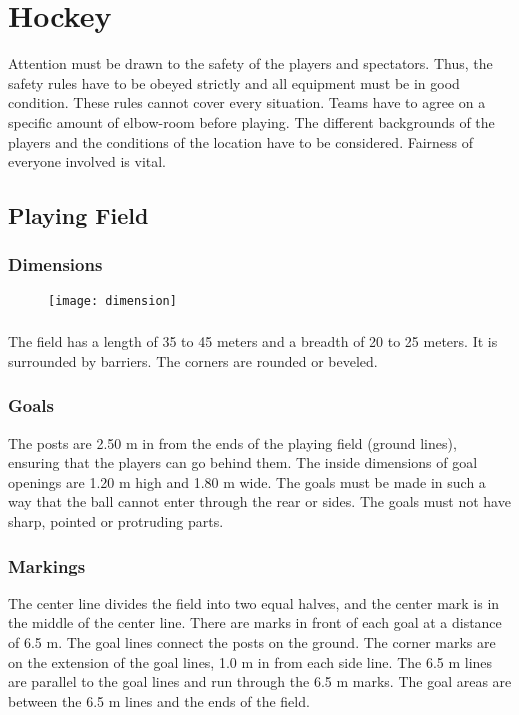 \chapter{Hockey \label{chap:hockey}}
Attention must be drawn to the safety of the players and spectators.
Thus, the safety rules have to be obeyed strictly and all equipment must be in good condition.
These rules cannot cover every situation.
Teams have to agree on a specific amount of elbow-room before playing.
The different backgrounds of the players and the conditions of the location have to be considered.
Fairness of everyone involved is vital.

\section{Playing Field}

\subsection{Dimensions}

\begin{figure}[h]
\begin{center}
\texttt{[image: dimension]}
\end{center}
\end{figure}

\subsection{}
The field has a length of 35 to 45 meters and a breadth of 20 to 25 meters.
It is surrounded by barriers.
The corners are rounded or beveled.

\subsection{Goals}
The posts are 2.50 m in from the ends of the playing field (ground lines), ensuring that the players can go behind them.
The inside dimensions of goal openings are 1.20 m high and 1.80 m wide.
The goals must be made in such a way that the ball cannot enter through the rear or sides. The goals must not have sharp, pointed or protruding parts.

\subsection{Markings}
The center line divides the field into two equal halves, and the center mark is in the middle of the center line.
There are marks in front of each goal at a distance of 6.5 m.
The goal lines connect the posts on the ground.
The corner marks are on the extension of the goal lines, 1.0 m in from each side line.
The 6.5 m lines are parallel to the goal lines and run through the 6.5 m marks.
The goal areas are between the 6.5 m lines and the ends of the field.

